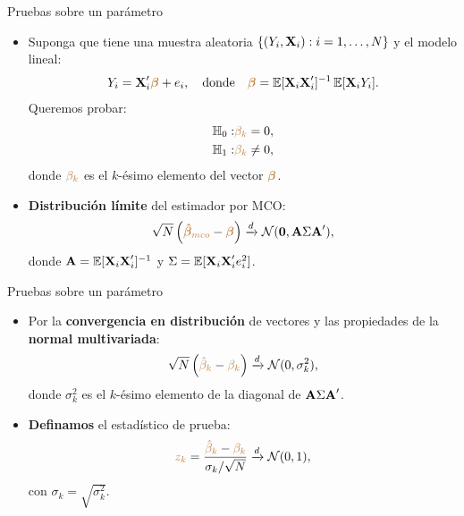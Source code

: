 \documentclass[10pt, xcolor=dvipsnames]{beamer}
\begin{document}
\begin{frame}{Pruebas sobre un parámetro}
\begin{itemize}
    \item Suponga que tiene una muestra aleatoria $\{(Y_i, \textbf{X}_{i}): i=1, \ldots,N\}$ y el modelo lineal: 
    \begin{align*}
        Y_i = \textbf{X}'_i \textcolor{brown}{\boldsymbol{\beta}} + e_i, \quad \text{donde} \quad  \textcolor{brown}{\boldsymbol{\beta}} = \operatorname{\mathbb{E}}[\textbf{X}_i\textbf{X}'_i]^{-1} \operatorname{\mathbb{E}}[\textbf{X}_iY_i].     
    \end{align*}
    Queremos probar:
    \vspace{-1em}
    \begin{align*}
    \begin{split}
        \textcolor{black}{\mathbb{H}_{0}}:& \textcolor{brown}{\beta_k} = 0, \\
        \textcolor{black}{\mathbb{H}_{1}}:& \textcolor{brown}{\beta_k} \neq 0,
    \end{split}
    \end{align*}
    donde \(\textcolor{brown}{\beta_k}\) es el \(k\)-ésimo elemento del vector \(\textcolor{brown}{\boldsymbol{\beta}}\).
    \vspace{1em}
    \item \textbf{Distribución límite} del estimador por MCO:
    \begin{align*}
    \begin{split}
    \sqrt{N}\left(\textcolor{brown}{\boldsymbol{\hat{\beta}}_{mco}}-\textcolor{brown}{\boldsymbol{\beta}}\right) \xrightarrow{d} \mathcal{N}(\mathbf{0}, \textbf{A} \Sigma \textbf{A}'),
    \end{split}
    \end{align*}
     donde \(\textbf{A} = \operatorname{\mathbb{E}}[\textbf{X}_i \textbf{X}_i']^{-1}\) y \(\Sigma = \operatorname{\mathbb{E}}[\textbf{X}_i \textbf{X}_i' e_i^2]\).
\end{itemize}
\end{frame}


\begin{frame}{Pruebas sobre un parámetro}
\begin{itemize}
    \item Por la \textbf{convergencia en distribución} de vectores y las propiedades de la \textbf{normal multivariada}:
    \begin{align*}
        \sqrt{N}\left(\textcolor{brown}{\hat{\beta}_{k}}-\textcolor{brown}{\beta_k}\right) \xrightarrow{d} \mathcal{N}(0, \sigma^2_k),
    \end{align*}
    donde \(\sigma^2_k\) es el \(k\)-ésimo elemento de la diagonal de \(\textbf{A} \Sigma \textbf{A}'\). %
    \vspace{1em}
    \item \textbf{Definamos} el estadístico de prueba:
    \begin{align*}
    \begin{split}
        \textcolor{brown}{z_k} = \frac{\textcolor{brown}{\hat{\beta}_k}-\textcolor{brown}{\beta_k}}{\sigma_k/\sqrt{N}} \xrightarrow{d} \mathcal{N}(0,1),
    \end{split}
    \end{align*}
    con \(\sigma_k = \sqrt{\sigma^2_k}\).
\end{itemize}
\end{frame}
\end{document}
